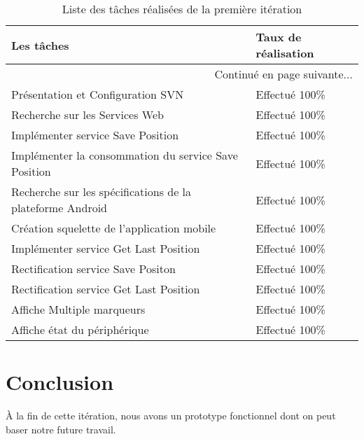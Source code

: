 \begin{center}
    \begin{longtable}{| l | l |}
        \caption{Liste des tâches réalisées de la première itération}
\label{tab:sprint1-evaluation} \\

        \hline
        \textbf{Les tâches} & \textbf{Taux de réalisation} \\ \hline
        \endhead

        \hline \multicolumn{2}{|r|}{{Continué en page suivante$\dotsc$}} \\ \hline
        \endfoot

        \hline \hline
        \endlastfoot

        \hline
Présentation et Configuration SVN & Effectué 100\% \\ \hline
Recherche sur les Services Web & Effectué 100\% \\ \hline
Implémenter service Save Position & Effectué 100\% \\ \hline
Implémenter la consommation du service Save Position & Effectué 100\% \\ \hline
Recherche sur les spécifications de la plateforme Android & Effectué 100\% \\ \hline
Création squelette de l'application mobile & Effectué 100\% \\ \hline
Implémenter service Get Last Position & Effectué 100\% \\ \hline
Rectification service Save Positon & Effectué 100\% \\ \hline
Rectification service Get Last Position & Effectué 100\% \\ \hline
Affiche Multiple marqueurs & Effectué 100\% \\ \hline
Affiche état du périphérique & Effectué 100\% \\ \hline
    \end{longtable}
\end{center}

\section*{Conclusion}

À la fin de cette itération, nous avons un prototype fonctionnel dont on peut
baser notre future travail.
